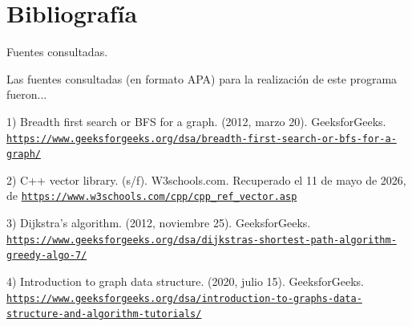 \chapter{Bibliografía }
\hypertarget{_bibliograf_xC3_xADa}{}\label{_bibliograf_xC3_xADa}
Fuentes consultadas.

Las fuentes consultadas (en formato APA) para la realización de este programa fueron...

1) Breadth first search or BFS for a graph. (2012, marzo 20). Geeksfor\+Geeks. \href{https://www.geeksforgeeks.org/dsa/breadth-first-search-or-bfs-for-a-graph/}{\texttt{https:\+/\+/\+www.\+geeksforgeeks.\+org/\+dsa/\+breadth-\/first-\/search-\/or-\/bfs-\/for-\/a-\/graph/\+}}

2) C++ vector library. (s/\+f). W3schools.\+com. Recuperado el 11 de mayo de 2026, de \href{https://www.w3schools.com/cpp/cpp_ref_vector.asp}{\texttt{https:\+/\+/\+www.\+w3schools.\+com/\+cpp/\+cpp\+\_\+ref\+\_\+vector.\+asp}}

3) Dijkstra’s algorithm. (2012, noviembre 25). Geeksfor\+Geeks. \href{https://www.geeksforgeeks.org/dsa/dijkstras-shortest-path-algorithm-greedy-algo-7/}{\texttt{https:\+/\+/\+www.\+geeksforgeeks.\+org/\+dsa/\+dijkstras-\/shortest-\/path-\/algorithm-\/greedy-\/algo-\/7/\+}}

4) Introduction to graph data structure. (2020, julio 15). Geeksfor\+Geeks. \href{https://www.geeksforgeeks.org/dsa/introduction-to-graphs-data-structure-and-algorithm-tutorials/}{\texttt{https:\+/\+/\+www.\+geeksforgeeks.\+org/\+dsa/\+introduction-\/to-\/graphs-\/data-\/structure-\/and-\/algorithm-\/tutorials/\+}} 